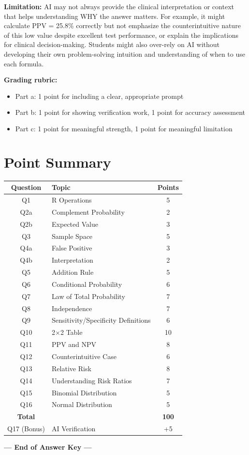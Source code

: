 \documentclass[11pt]{article}
\begin{document}
\textbf{Limitation:} AI may not always provide the clinical interpretation or context that helps understanding WHY the answer matters. For example, it might calculate PPV = 25.8\% correctly but not emphasize the counterintuitive nature of this low value despite excellent test performance, or explain the implications for clinical decision-making. Students might also over-rely on AI without developing their own problem-solving intuition and understanding of when to use each formula.

\textbf{Grading rubric:}
\begin{itemize}
    \item Part a: 1 point for including a clear, appropriate prompt
    \item Part b: 1 point for showing verification work, 1 point for accuracy assessment
    \item Part c: 1 point for meaningful strength, 1 point for meaningful limitation
\end{itemize}

\vspace{0.3cm}
\noindent\hrulefill

\section*{Point Summary}

\begin{center}
\begin{tabular}{clc}
\toprule
\textbf{Question} & \textbf{Topic} & \textbf{Points} \\
\midrule
Q1 & R Operations & 5 \\
Q2a & Complement Probability & 2 \\
Q2b & Expected Value & 3 \\
Q3 & Sample Space & 5 \\
Q4a & False Positive & 3 \\
Q4b & Interpretation & 2 \\
Q5 & Addition Rule & 5 \\
Q6 & Conditional Probability & 6 \\
Q7 & Law of Total Probability & 7 \\
Q8 & Independence & 7 \\
Q9 & Sensitivity/Specificity Definitions & 6 \\
Q10 & 2$\times$2 Table & 10 \\
Q11 & PPV and NPV & 8 \\
Q12 & Counterintuitive Case & 6 \\
Q13 & Relative Risk & 8 \\
Q14 & Understanding Risk Ratios & 7 \\
Q15 & Binomial Distribution & 5 \\
Q16 & Normal Distribution & 5 \\
\midrule
\textbf{Total} &  & \textbf{100} \\
Q17 (Bonus) & AI Verification & +5 \\
\bottomrule
\end{tabular}
\end{center}

\vspace{0.5cm}
\begin{center}
\textbf{--- End of Answer Key ---}
\end{center}
\end{document}
